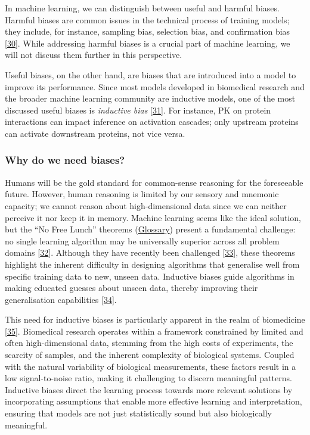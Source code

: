 In machine learning, we can distinguish between useful and harmful biases.
Harmful biases are common issues in the technical process of training models; they include, for instance, sampling bias, selection bias, and confirmation bias {[}\protect\hyperlink{ref-B5WSzZkm}{30}{]}.
While addressing harmful biases is a crucial part of machine learning, we will not discuss them further in this perspective.

Useful biases, on the other hand, are biases that are introduced into a model to improve its performance.
Since most models developed in biomedical research and the broader machine learning community are inductive models, one of the most discussed useful biases is \emph{inductive bias} {[}\protect\hyperlink{ref-2RptKLT2}{31}{]}.
For instance, PK on protein interactions can impact inference on activation cascades; only upstream proteins can activate downstream proteins, not vice versa.

\hypertarget{why-do-we-need-biases}{%
\subsubsection{Why do we need biases?}\label{why-do-we-need-biases}}

Humans will be the gold standard for common-sense reasoning for the foreseeable future.
However, human reasoning is limited by our sensory and mnemonic capacity; we cannot reason about high-dimensional data since we can neither perceive it nor keep it in memory.
Machine learning seems like the ideal solution, but the ``No Free Lunch'' theorems (\protect\hyperlink{no-free-lunch-theorems}{Glossary}) present a fundamental challenge: no single learning algorithm may be universally superior across all problem domains {[}\protect\hyperlink{ref-nT3xJkyD}{32}{]}.
Although they have recently been challenged {[}\protect\hyperlink{ref-D3JIQ7Oe}{33}{]}, these theorems highlight the inherent difficulty in designing algorithms that generalise well from specific training data to new, unseen data.
Inductive biases guide algorithms in making educated guesses about unseen data, thereby improving their generalisation capabilities {[}\protect\hyperlink{ref-11wELIlTc}{34}{]}.

This need for inductive biases is particularly apparent in the realm of biomedicine {[}\protect\hyperlink{ref-1AZn5l2ah}{35}{]}.
Biomedical research operates within a framework constrained by limited and often high-dimensional data, stemming from the high costs of experiments, the scarcity of samples, and the inherent complexity of biological systems.
Coupled with the natural variability of biological measurements, these factors result in a low signal-to-noise ratio, making it challenging to discern meaningful patterns.
Inductive biases direct the learning process towards more relevant solutions by incorporating assumptions that enable more effective learning and interpretation, ensuring that models are not just statistically sound but also biologically meaningful.

